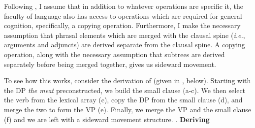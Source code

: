 \documentclass[letterpaper,12pt]{article}
\begin{document}
Following \textcite{hornstein2009theory,nunes2001sideward}, I assume that in addition to whatever operations are specific it, the faculty of language also has access to operations which are required for general cognition, specifically, a copying operation.
Furthermore, I make the necessary assumption that phrasal elements which are merged with the clausal spine (\textit{i.e.}, arguments and adjuncts) are derived separate from the clausal spine.
A copying operation, along with the necessary assumption that subtrees are derived separately before being merged together, gives us sideward movement.

To see how this works, consider the derivation of \Last (given in \Next, below).
Starting with the DP \textit{the meat} preconstructed, we build the small clause (a-c).
We then select the verb from the lexical array (c), copy the DP from the small clause (d), and merge the two to form the VP (e).
Finally, we merge the VP and the small clause (f) and we are left with a sideward movement structure.
  \ex. \textbf{Deriving \LLast}\\
\end{document}

